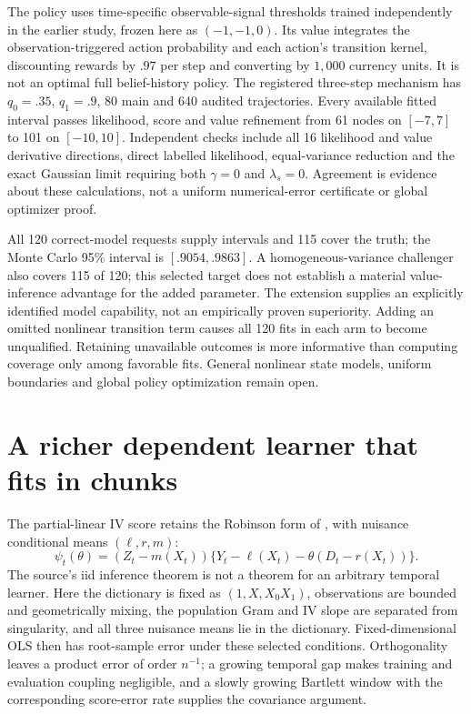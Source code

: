 The policy uses time-specific observable-signal thresholds trained independently
in the earlier study, frozen here as $(-1,-1,0)$. Its value integrates the
observation-triggered action probability and each action's transition kernel,
discounting rewards by $.97$ per step and converting by $1,000$ currency units.
It is not an optimal full belief-history policy. The registered three-step
mechanism has $q_0=.35$, $q_1=.9$, 80 main and 640 audited trajectories.
Every available fitted interval passes likelihood, score and value refinement
from 61 nodes on $[-7,7]$ to 101 on $[-10,10]$. Independent checks include all
16 likelihood and value derivative directions, direct labelled likelihood,
equal-variance reduction and the exact Gaussian limit requiring both
$\gamma=0$ and $\lambda_s=0$. Agreement is evidence about these calculations,
not a uniform numerical-error certificate or global optimizer proof.

All 120 correct-model requests supply intervals and 115 cover the truth;
the Monte Carlo 95\% interval is $[.9054,.9863]$. A homogeneous-variance challenger
also covers 115 of 120; this selected target does not establish a material
value-inference advantage for the added parameter. The extension supplies an
explicitly identified model capability, not an empirically proven superiority.
Adding an omitted nonlinear transition term causes all 120 fits in each arm
to become unqualified. Retaining unavailable outcomes is more informative than
computing coverage only among favorable fits. General nonlinear state models,
uniform boundaries and global policy optimization remain open.

\section{A richer dependent learner that fits in chunks}
\label{r8:learning}

The partial-linear IV score retains the Robinson form of
\citet{dml2018}, with nuisance conditional means $(\ell,r,m)$:
\[
 \psi_t(\theta)=(Z_t-m(X_t))
       \{Y_t-\ell(X_t)-\theta(D_t-r(X_t))\}.
\]
The source's iid inference theorem is not a theorem for an arbitrary temporal
learner. Here the dictionary is fixed as $(1,X,X_0X_1)$, observations are bounded
and geometrically mixing, the population Gram and IV slope are separated from
singularity, and all three nuisance means lie in the dictionary. Fixed-dimensional
OLS then has root-sample error under these selected conditions. Orthogonality
leaves a product error of order $n^{-1}$; a growing temporal gap makes training
and evaluation coupling negligible, and a slowly growing Bartlett window with
the corresponding score-error rate supplies the covariance argument.

